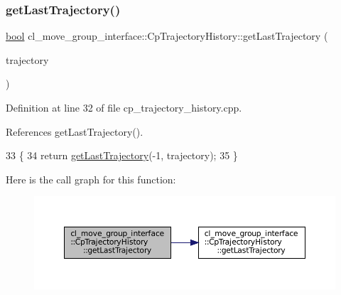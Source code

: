 \mbox{\label{classcl__move__group__interface_1_1CpTrajectoryHistory_aa9026698871b1e9d3ef5ee29e362802f}} 
\subsubsection{\texorpdfstring{get\+Last\+Trajectory()}{getLastTrajectory()}\hspace{0.1cm}{\footnotesize\ttfamily [2/2]}}
{\footnotesize\ttfamily \hyperlink{classbool}{bool} cl\+\_\+move\+\_\+group\+\_\+interface\+::\+Cp\+Trajectory\+History\+::get\+Last\+Trajectory (\begin{DoxyParamCaption}\item[{moveit\+\_\+msgs\+::\+Robot\+Trajectory \&}]{trajectory }\end{DoxyParamCaption})}



Definition at line 32 of file cp\+\_\+trajectory\+\_\+history.\+cpp.



References get\+Last\+Trajectory().


\begin{DoxyCode}
33     \{
34         \textcolor{keywordflow}{return} \hyperlink{classcl__move__group__interface_1_1CpTrajectoryHistory_acca64f5923a0960c704e3e8a727ba3ae}{getLastTrajectory}(-1, trajectory);
35     \}
\end{DoxyCode}
Here is the call graph for this function\+:
\nopagebreak
\begin{figure}[H]
\begin{center}
\leavevmode
\includegraphics[width=350pt]{classcl__move__group__interface_1_1CpTrajectoryHistory_aa9026698871b1e9d3ef5ee29e362802f_cgraph}
\end{center}
\end{figure}
\mbox{\label{classcl__move__group__interface_1_1CpTrajectoryHistory_adf3f9a3fed4ef7b1adf23a098d3451ec}} 
